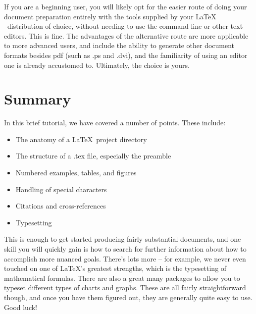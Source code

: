 If you are a beginning user, you will likely opt for the easier route of doing
your document preparation entirely with the tools supplied by your \LaTeX
~distribution of choice, without needing to use the command line or other text
editors. This is fine. The advantages of the alternative route are more
applicable to more advanced users, and include the ability to generate other
document formats besides pdf (such as .ps and .dvi), and the familiarity of
using an editor one is already accustomed to. Ultimately, the choice is yours.

\section{Summary}
In this brief tutorial, we have covered a number of points. These include:

\begin{itemize}
  \item The anatomy of a \LaTeX ~project directory
  \item The structure of a .tex file, especially the preamble
  \item Numbered examples, tables, and figures
  \item Handling of special characters
  \item Citations and cross-references
  \item Typesetting
\end{itemize}
This is enough to get started producing fairly substantial documents, and one
skill you will quickly gain is how to search for further information about
how to accomplish more nuanced goals. There's lots more -- for example, we
never even touched on one of \LaTeX's greatest strengths, which is the 
typesetting of mathematical formulas. There are also a great many packages to
allow you to typeset different types of charts and graphs. These are all
fairly straightforward though, and once you have them figured out, they are
generally quite easy to use. Good luck!
   
   